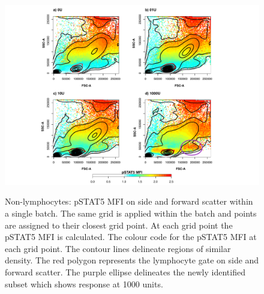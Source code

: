 \begin{figure}
\centering
\begin{minipage}{.65\textwidth}
\includegraphics[width=\linewidth]{figures/nonlymphocytes-KM00782Z-2012-07-23}
\end{minipage}
\begin{minipage}{.3\textwidth}
{ Non-lymphocytes: pSTAT5 MFI on side and forward scatter within a single batch. } 
{
    The same grid is applied within the batch and points are assigned to their closest grid point.
    At each grid point the pSTAT5 MFI is calculated.
    The colour code for the pSTAT5 MFI at each grid point.
    The contour lines delineate regions of similar density.
    The red polygon represents the lymphocyte gate on side and forward scatter.
    The purple ellipse delineates the newly identified subset which shows response at 1000 units.
}
\end{minipage}
%

\end{figure}
